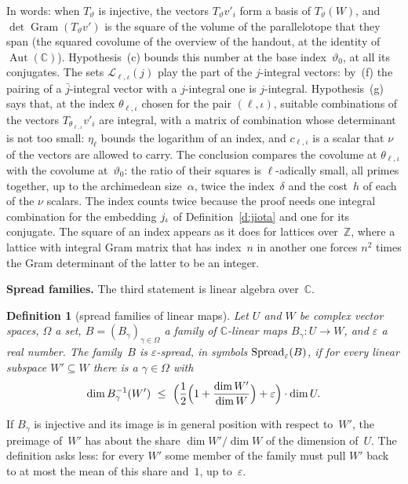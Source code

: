 \documentclass[11pt,a4paper]{article}
\makeatletter
\newcommand{\lean}[1]{\csname LN@#1\endcsname}
\newcommand{\Z}{\mathbb{Z}}
\newcommand{\kw}[1]{\emph{#1}}
\newcommand{\m}[1]{\mbox{$#1$}}        %
\newcommand{\subhead}[1]{\par\addvspace{9pt plus 2pt}\Needspace{4\baselineskip}\noindent\textbf{#1}\enspace\ignorespaces}
\newcommand{\leantag}{{\sffamily\bfseries\fontsize{6.3}{8}\selectfont\color{leancol}\addfontfeatures{LetterSpace=7}LEAN}}
\newcommand{\leanline}[1]{\par\nopagebreak\vspace{-2.5pt}{\fontsize{8.9}{12.4}\selectfont\color{inksoft}\raggedright
  \noindent\llap{\leantag\hspace{9pt}}#1\par}\vspace{1pt}}
\theoremstyle{plainx}
\theoremstyle{uprightx}
\newtheorem{definition}[theorem]{Definition}
\newcommand{\CC}{\mathbb{C}}
\newcommand{\AutC}{\operatorname{Aut}(\mathbb{C})}
\newcommand{\Ls}{\mathcal{L}}
\newcommand{\Gram}{\operatorname{Gram}}
\makeatother
\begin{document}
In words: when $T_\vartheta$ is injective, the vectors $T_\vartheta v'_i$ form a basis of $T_\vartheta(W)$, and
$\det\Gram(T_\vartheta v')$ is the square of the volume of the parallelotope that they span (the squared covolume of
the overview of the handout, at the identity of~$\AutC$). Hypothesis~(c) bounds this number at the base index~$\vartheta_0$, at all its conjugates.
The sets $\Ls_{\ell,\iota}(j)$ play the part of the $j$-integral vectors: by~(f) the pairing of a $\bar j$-integral
vector with a $j$-integral one is $j$-integral. Hypothesis~(g) says that, at the index $\theta_{\ell,\iota}$ chosen
for the pair $(\ell,\iota)$, suitable combinations of the vectors $T_{\theta_{\ell,\iota}}v'_i$ are integral, with a
matrix of combination whose determinant is not too small: $\eta_\ell$ bounds the logarithm of an index, and
$c_{\ell,\iota}$ is a scalar that $\nu$ of the vectors are allowed to carry. The conclusion compares the covolume at
$\theta_{\ell,\iota}$ with the covolume at~$\vartheta_0$: the ratio of their squares is $\ell$-adically small, all
primes together, up to the archimedean size~$\alpha$, twice the index~$\delta$ and the cost~$h$ of each of the $\nu$
scalars. The index counts twice because the proof needs one integral combination for the embedding $j_{\iota}$
of Definition~\ref{d:jiota} and one for its conjugate. The square of an index appears as it does for lattices over~$\Z$, where a lattice with integral Gram
matrix that has index~$n$ in another one forces $n^2$ times the Gram determinant of the latter to be an integer.

\subhead{Spread families.} The third statement is linear algebra over~$\CC$.

\begin{definition}[spread families of linear maps]\label{d:spread}
Let $U$ and $W$ be complex vector spaces, $\Omega$ a set, $B=(B_\gamma)_{\gamma\in\Omega}$ a family of $\CC$-linear
maps \m{B_\gamma\colon U\to W}, and $\varepsilon$ a real number. The family~$B$ is \kw{$\varepsilon$-spread}, in
symbols \m{\spread{B}{\varepsilon}}, if for every linear subspace \m{W'\subseteq W} there is a $\gamma\in\Omega$ with
\[\dim B_\gamma^{-1}(W')\ \le\ \Bigl(\frac12\Bigl(1+\frac{\dim W'}{\dim W}\Bigr)+\varepsilon\Bigr)\cdot\dim U .\]
\end{definition}
\leanline{\lean{spread}}

If $B_\gamma$ is injective and its image is in general position with respect to~$W'$, the preimage of~$W'$ has
about the share \m{\dim W'/\dim W} of the dimension of~$U$. The definition asks less: for every $W'$ some member of
the family must pull $W'$ back to at most the mean of this share and~$1$, up to~$\varepsilon$.
\end{document}
